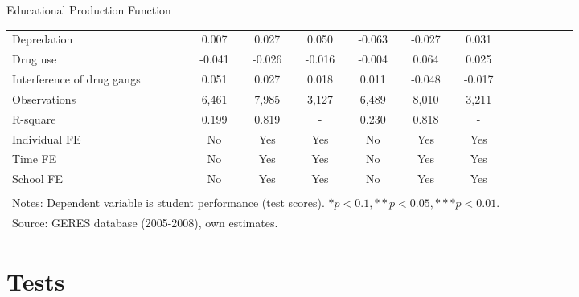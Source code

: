 \documentclass{beamer}
\begin{document}
\begin{frame}{Educational Production Function}
\begin{table}
\begin{adjustbox}{max width=\textwidth}
\begin{tabular}{l*{6}{cc}}
Depredation         &       0.007   &       0.027   &       0.050   &      -0.063   &      -0.027   &       0.031   \\
Drug use            &      -0.041   &      -0.026   &      -0.016   &      -0.004   &       0.064   &       0.025   \\
Interference of drug gangs&       0.051   &       0.027   &       0.018   &       0.011   &      -0.048   &      -0.017 \vspace{-2pt}  \\
 \hline
Observations        &        6,461   &        7,985   &        3,127   &        6,489   &        8,010   &        3,211   \\
R-square            &       0.199   &       0.819   &      -   &       0.230   &       0.818   &      -   \vspace{-2pt} \\
\hline Individual FE&          No   &         Yes   &         Yes   &          No   &         Yes   &         Yes   \\
Time FE             &          No   &         Yes   &         Yes   &          No   &         Yes   &         Yes   \\
School FE           &          No   &         Yes   &         Yes   &          No   &         Yes   &         Yes \\
\bottomrule
\vspace{-18pt} \\
\multicolumn{7}{l}{\tiny Notes: Dependent variable is student performance (test scores). \( * p<0.1, ** p<0.05, *** p<0.01 \).} \vspace{-8pt}\\
\multicolumn{7}{l}{\tiny Source: GERES database (2005-2008), own estimates.}\\
\end{tabular}
\end{adjustbox}
\end{table}
\end{frame}



\section{Tests}
\end{document}
